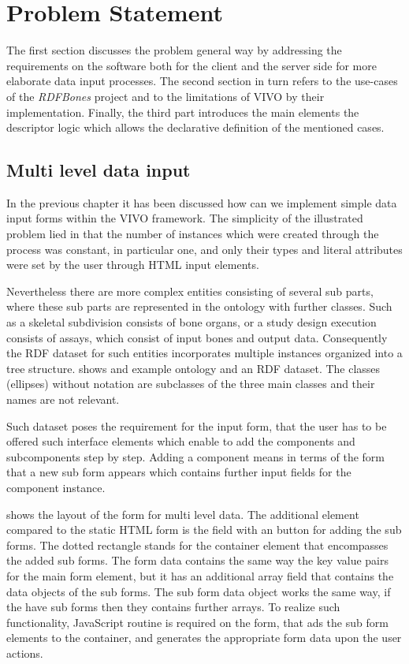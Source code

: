 \chapter{Problem Statement}

The first section discusses the problem general way by addressing the requirements on the software both for the client and the server side for more elaborate data input processes. The second section in turn refers to the use-cases of the \textit{RDFBones} project and to the limitations of VIVO by their implementation. Finally, the third part introduces the main elements the descriptor logic which allows the declarative definition of the mentioned cases.

\section{Multi level data input}

In the previous chapter it has been discussed how can we implement simple data input forms within the VIVO framework. The simplicity of the illustrated problem lied in that the number of instances which were created through the process was constant, in particular one, and only their types and literal attributes were set by the user through HTML input elements. 


Nevertheless there are more complex entities consisting of several sub parts, where these sub parts are represented in the ontology with further classes. Such as a skeletal subdivision consists of bone organs, or a study design execution consists of assays, which consist of input bones and output data. Consequently the RDF dataset for such entities incorporates multiple instances organized into a tree structure.  shows and example ontology and an RDF dataset. The classes (ellipses) without notation are subclasses of the three main classes and their names are not relevant.

Such dataset poses the requirement for the input form, that the user has to be offered such interface elements which enable to add the components and subcomponents step by step. Adding a component means in terms of the form that a new sub form appears which contains further input fields for the component instance.


 shows the layout of the form for multi level data. The additional element compared to the static HTML form is the field with an button for adding the sub forms. The dotted rectangle stands for the container element that encompasses the added sub forms. The form data contains the same way the key value pairs for the main form element, but it has an additional array field that contains the data objects of the sub forms. The sub form data object works the same way, if the have sub forms then they contains further arrays. To realize such functionality, JavaScript routine is required on the form, that ads the sub form elements to the container, and generates the appropriate form data upon the user actions.

